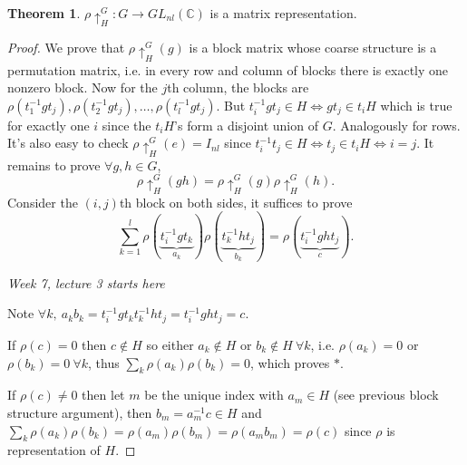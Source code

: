 \documentclass{article}
\newcommand{\C}{\mathbb{C}}
\theoremstyle{definition}
\newtheorem{thm}[defn]{Theorem}
\begin{document}
\begin{thm}
$\rho\uparrow_H^G:G\rightarrow GL_{nl}(\C)$ is a matrix representation.
\end{thm}
\begin{proof}
We prove that $\rho\uparrow_H^G(g)$ is a block matrix whose coarse structure is a permutation matrix, i.e. in every row and column of blocks there is exactly one nonzero block. Now for the $j$th column, the blocks are $\rho(t_1^{-1}gt_j),\rho(t_2^{-1}gt_j),\ldots,\rho(t_l^{-1}gt_j)$. But $t_i^{-1}gt_j\in H\iff gt_j\in t_iH$ which is true for exactly one $i$ since the $t_iH$'s form a disjoint union of $G$. Analogously for rows. It's also easy to check $\rho\uparrow_H^G(e)=I_{nl}$ since $t_i^{-1}t_j\in H\iff t_j\in t_iH\iff i=j$. It remains to prove $\forall g,h\in G$,
\[
\rho\uparrow_H^G(gh)=\rho\uparrow_H^G(g)\rho\uparrow_H^G(h).
\]
Consider the $(i,j)$th block on both sides, it suffices to prove
\[
\tag{$\ast$}
\sum_{k=1}^l\rho(\underbrace{t_i^{-1}gt_k}_{a_k})\rho(\underbrace{t_k^{-1}ht_j}_{b_k})=\rho(\underbrace{t_i^{-1}ght_j}_{c}).
\]

\begin{flushright}
\textit{Week 7, lecture 3 starts here}
\end{flushright}

Note $\forall k,\ a_kb_k=t_i^{-1}gt_kt_k^{-1}ht_j=t_i^{-1}ght_j=c$.

If $\rho(c)=0$ then $c\notin H$ so either $a_k\notin H$ or $b_k\notin H \ \forall k$, i.e. $\rho(a_k)=0$ or $\rho(b_k)=0 \ \forall k$, thus $\sum_k \rho(a_k)\rho(b_k)=0$, which proves $\ast$.

If $\rho(c)\neq 0$ then let $m$ be the unique index with $a_m\in H$ (see previous block structure argument), then $b_m=a_m^{-1}c\in H$ and $\sum_k \rho(a_k)\rho(b_k)=\rho(a_m)\rho(b_m)=\rho(a_mb_m)=\rho(c)$ since $\rho$ is representation of $H$.
\end{proof}
\end{document}
